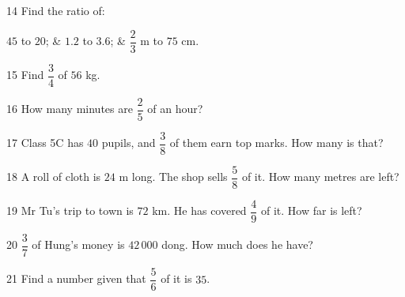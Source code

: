 \gap
\begin{probbox}{14}{\relax}
Find the ratio of:
\begin{cols3}
 $45$ to $20$; &  $1.2$ to $3.6$; &  $\dfrac23$ m to $75$ cm.
\end{cols3}
\end{probbox}
\gap
\begin{probbox}{15}{\relax}
Find $\dfrac34$ of $56$ kg.
\end{probbox}
\gap
\begin{probbox}{16}{\relax}
How many minutes are $\dfrac25$ of an hour?
\end{probbox}
\gap
\begin{probbox}{17}{\relax}
Class 5C has $40$ pupils, and $\dfrac38$ of them earn top marks. How many is that?
\end{probbox}
\gap
\begin{probbox}{18}{\relax}
A roll of cloth is $24$ m long. The shop sells $\dfrac58$ of it. How many metres are left?
\end{probbox}
\gap
\begin{probbox}{19}{\relax}
Mr Tu's trip to town is $72$ km. He has covered $\dfrac49$ of it. How far is left?
\end{probbox}
\gap
\begin{probbox}{20}{\relax}
$\dfrac37$ of Hung's money is $42\,000$ dong. How much does he have?
\end{probbox}
\gap
\begin{probbox}{21}{\relax}
Find a number given that $\dfrac56$ of it is $35$.
\end{probbox}
